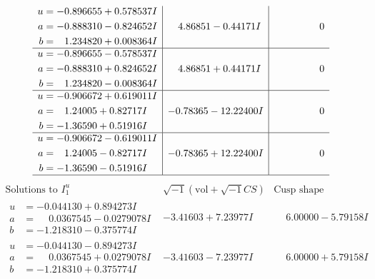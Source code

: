 \documentclass[1p]{elsarticle_modified}
\theoremstyle{definition}
\newcommand{\I}{\sqrt{-1}}
\begin{document}
$$\begin{array}{c|c|c}
\begin{aligned}
u &= -0.896655 + 0.578537 I \\
a &= -0.888310 - 0.824652 I \\
b &= \phantom{-}1.234820 + 0.008364 I\end{aligned}
 & \phantom{-}4.86851 - 0.44171 I & \phantom{-0.000000 } 0 \\ \hline\begin{aligned}
u &= -0.896655 - 0.578537 I \\
a &= -0.888310 + 0.824652 I \\
b &= \phantom{-}1.234820 - 0.008364 I\end{aligned}
 & \phantom{-}4.86851 + 0.44171 I & \phantom{-0.000000 } 0 \\ \hline\begin{aligned}
u &= -0.906672 + 0.619011 I \\
a &= \phantom{-}1.24005 + 0.82717 I \\
b &= -1.36590 + 0.51916 I\end{aligned}
 & -0.78365 - 12.22400 I & \phantom{-0.000000 } 0 \\ \hline\begin{aligned}
u &= -0.906672 - 0.619011 I \\
a &= \phantom{-}1.24005 - 0.82717 I \\
b &= -1.36590 - 0.51916 I\end{aligned}
 & -0.78365 + 12.22400 I & \phantom{-0.000000 } 0\\
 \hline 
 \end{array}$$\newpage$$\begin{array}{c|c|c}  
\text{Solutions to }I^u_{1}& \I (\text{vol} + \sqrt{-1}CS) & \text{Cusp shape}\\
 \hline 
\begin{aligned}
u &= -0.044130 + 0.894273 I \\
a &= \phantom{-}0.0367545 - 0.0279078 I \\
b &= -1.218310 - 0.375774 I\end{aligned}
 & -3.41603 + 7.23977 I & \phantom{-}6.00000 - 5.79158 I \\ \hline\begin{aligned}
u &= -0.044130 - 0.894273 I \\
a &= \phantom{-}0.0367545 + 0.0279078 I \\
b &= -1.218310 + 0.375774 I\end{aligned}
 & -3.41603 - 7.23977 I & \phantom{-}6.00000 + 5.79158 I \\ \hline\begin{aligned}

\end{aligned}
\end{array}$$
\end{document}
